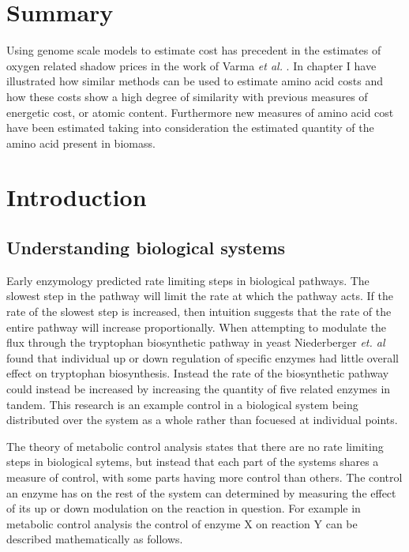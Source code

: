 \section*{Summary}

Using genome scale models to estimate cost has precedent in the estimates of oxygen related shadow prices in the work of Varma \emph{et al.} \cite{varma1993}. In chapter I have illustrated how similar methods can be used to estimate amino acid costs and how these costs show a high degree of similarity with previous measures of energetic cost, or atomic content. Furthermore new measures of amino acid cost have been estimated taking into consideration the estimated quantity of the amino acid present in biomass.

\clearpage

\section{Introduction}

\subsection{Understanding biological systems}

Early enzymology predicted rate limiting steps in biological pathways. The slowest step in the pathway will limit the rate at which the pathway acts. If the rate of the slowest step is increased, then intuition suggests that the rate of the entire pathway will increase proportionally. When attempting to modulate the flux through the tryptophan biosynthetic pathway in yeast Niederberger \emph{et. al} \cite{niederberger1992} found that individual up or down regulation of specific enzymes had little overall effect on tryptophan biosynthesis. Instead the rate of the biosynthetic pathway could instead be increased by increasing the quantity of five related enzymes in tandem. This research is an example control in a biological system being distributed over the system as a whole rather than focuesed at individual points.

The theory of metabolic control analysis \cite{fell} states that there are no rate limiting steps in biological sytems, but instead that each part of the systems shares a measure of control, with some parts having more control than others. The control an enzyme has on the rest of the system can determined by measuring the effect of its up or down modulation on the reaction in question. For example in metabolic control analysis the control of enzyme X on reaction Y can be described mathematically as follows.


